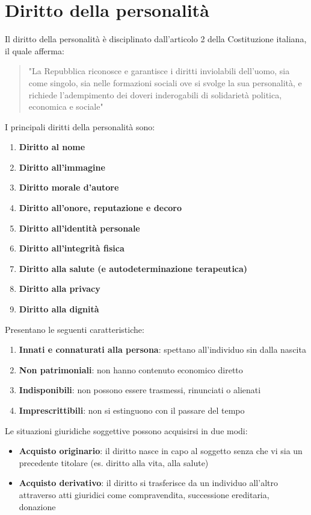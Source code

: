 \documentclass[8pt,oneside,a4paper]{article}
\begin{document}
	\section{Diritto della personalità}
	Il diritto della personalità è disciplinato dall'articolo 2 della Costituzione italiana, il quale afferma:
	\begin{quote}
		"La Repubblica riconosce e garantisce i diritti inviolabili dell'uomo, sia come singolo, sia nelle formazioni sociali ove si svolge la sua personalità, e richiede l'adempimento dei doveri inderogabili di solidarietà politica, economica e sociale"
	\end{quote}
	I principali diritti della personalità sono:  
	\begin{enumerate}
		\item \textbf{Diritto al nome}  
		\item \textbf{Diritto all'immagine}  
		\item \textbf{Diritto morale d'autore}  
		\item \textbf{Diritto all'onore, reputazione e decoro}  
		\item \textbf{Diritto all'identità personale}  
		\item \textbf{Diritto all'integrità fisica}  
		\item \textbf{Diritto alla salute (e autodeterminazione terapeutica)}  
		\item \textbf{Diritto alla privacy}  
		\item \textbf{Diritto alla dignità}  
	\end{enumerate}
	Presentano le seguenti caratteristiche:  
	\begin{enumerate}
		\item \textbf{Innati e connaturati alla persona}: spettano all'individuo sin dalla nascita
		\item \textbf{Non patrimoniali}: non hanno contenuto economico diretto
		\item \textbf{Indisponibili}: non possono essere trasmessi, rinunciati o alienati
		\item \textbf{Imprescrittibili}: non si estinguono con il passare del tempo
	\end{enumerate}
	Le situazioni giuridiche soggettive possono acquisirsi in due modi:  
	\begin{itemize}
		\item \textbf{Acquisto originario}: il diritto nasce in capo al soggetto senza che vi sia un precedente titolare (es. diritto alla vita, alla salute)
		\item \textbf{Acquisto derivativo}: il diritto si trasferisce da un individuo all'altro attraverso atti giuridici come compravendita, successione ereditaria, donazione
	\end{itemize}
\end{document}
